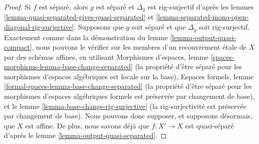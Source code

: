 \begin{proof}
Si $f$ est séparé, alors $g$ est séparé et $\Delta_g$
est rig-surjectif d'après les
lemmes \ref{lemma-quasi-separated-gives-quasi-separated} et
\ref{lemma-separated-mono-open-diagonal-rig-surjective}.
Supposons que $g$ soit séparé et que $\Delta_g$ soit rig-surjectif.
Exactement comme dans la démonstration du
lemme \ref{lemma-output-quasi-compact},
nous pouvons le vérifier sur les membres d'un recouvrement étale de $X$
par des schémas affines, en utilisant
Morphismes d'espaces, lemme \ref{spaces-morphisms-lemma-base-change-separated}
(la propriété d'être séparé pour les morphismes d'espaces algébriques est
locale sur la base), Espaces formels, lemme
\ref{formal-spaces-lemma-base-change-separated}
(la propriété d'être séparé pour les morphismes d'espaces algébriques
formels est préservée par changement de base), et le
lemme \ref{lemma-base-change-rig-surjective} (la rig-surjectivité
est préservée par changement de base).
Nous pouvons donc supposer, et supposons désormais, que $X$ est affine.
De plus, nous savons déjà que $f : X' \to X$ est quasi-séparé d'après le
lemme \ref{lemma-output-quasi-separated}.


\end{proof}
